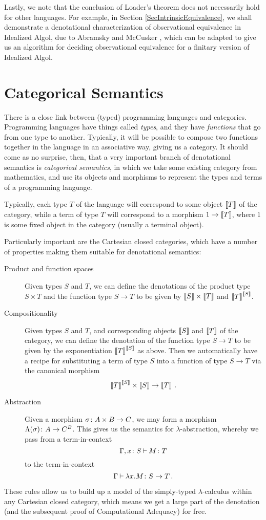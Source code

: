 Lastly, we note that the conclusion of Loader's theorem does not necessarily hold for other languages.  
For example, in Section \ref{SecIntrinsicEquivalence}, we shall demonstrate a denotational characterization of observational equivalence in Idealized Algol, due to Abramsky and McCusker \cite{SamsonGuyIAActive}, which can be adapted to give us an algorithm for deciding observational equivalence for a finitary version of Idealized Algol.

\section{Categorical Semantics}
\label{SecCatSem}

There is a close link between (typed) programming languages and categories.
Programming languages have things called \emph{types}, and they have \emph{functions} that go from one type to another. 
Typically, it will be possible to compose two functions together in the language in an associative way, giving us a category.
It should come as no surprise, then, that a very important branch of denotational semantics is \emph{categorical semantics}, in which we take some existing category from mathematics, and use its objects and morphisms to represent the types and terms of a programming language.

Typically, each type $T$ of the language will correspond to some object $\left\llbracket T\right\rrbracket$ of the category, while a term of type $T$ will correspond to a morphism $1 \to \left\llbracket T\right\rrbracket$, where $1$ is some fixed object in the category (usually a terminal object).

Particularly important \cite{Lambek} are the Cartesian closed categories, which have a number of properties making them suitable for denotational semantics:
\begin{description}
  \item[Product and function spaces] Given types $S$ and $T$, we can define the denotations of the product type $S \times T$ and the function type $S \to T$ to be given by $\left\llbracket S\right\rrbracket \times \left\llbracket T\right\rrbracket$ and ${\left\llbracket T\right\rrbracket}^{\left\llbracket S\right\rrbracket}$.
  \item[Compositionality] Given types $S$ and $T$, and corresponding objects $\left\llbracket S\right\rrbracket$ and $\left\llbracket T\right\rrbracket$ of the category, we can define the denotation of the function type $S \to T$ to be given by the exponentiation ${\left\llbracket T\right\rrbracket}^{\left\llbracket S\right\rrbracket}$ as above.
    Then we automatically have a recipe for substituting a term of type $S$ into a function of type $S\to T$ via the canonical morphism
    \[
      {\left\llbracket T\right\rrbracket}^{\left\llbracket S\right\rrbracket} \times \left\llbracket S\right\rrbracket \to \left\llbracket T\right\rrbracket\,.
      \]
  \item[Abstraction] Given a morphism $\sigma \colon A \times B \to C$, we may form a morphism $\Lambda(\sigma) \colon A \to C^B$.
    This gives us the semantics for $\lambda$-abstraction, whereby we pass from a term-in-context
    \[
      \Gamma,x\colon S \mathbin{\vdash} M \colon T
      \]
    to the term-in-context
    \[
      \Gamma \mathbin{\vdash} \lambda x.M\colon S \to T\,.
      \]
\end{description}
These rules allow us to build up a model of the simply-typed $\lambda$-calculus within any Cartesian closed category, which means we get a large part of the denotation (and the subsequent proof of Computational Adequacy) for free.  

